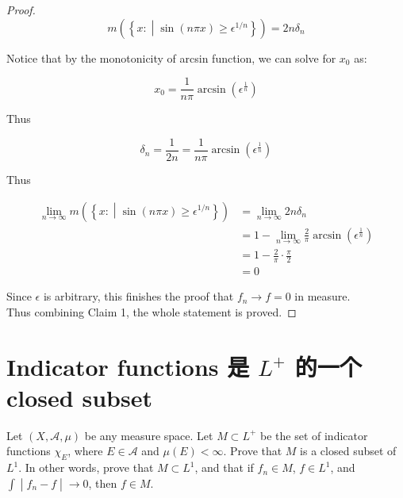 \documentclass{qlnotes-export}
\begin{document}
\begin{proof}
\[m(\left\{ x: \middle| \sin(n\pi x) \geq \epsilon^{1/n} \right\}) = 2n\delta_{n}\]

Notice that by the monotonicity of arcsin function, we can solve for \(x_{0}\) as:

\[x_{0} = \frac{1}{n\pi}\arcsin(\epsilon^{\frac{1}{n}})\]

Thus

\[\delta_{n} = \frac{1}{2n} = \frac{1}{n\pi}\arcsin(\epsilon^{\frac{1}{n}})\]

Thus

\[\begin{matrix}
{\lim\limits_{n\rightarrow\infty}m(\left\{ x: \middle| \sin(n\pi x) \geq \epsilon^{1/n} \right\})} & {= \lim\limits_{n\rightarrow\infty}2n\delta_{n}} \\
 & {= 1 - \lim\limits_{n\rightarrow\infty}\frac{2}{\pi}\arcsin(\epsilon^{\frac{1}{n}})} \\
 & {= 1 - \frac{2}{\pi} \cdot \frac{\pi}{2}} \\
 & {= 0}
\end{matrix}\]

Since \(\epsilon\) is arbitrary, this finishes the proof that \(f_{n}\rightarrow f = 0\) in measure.\\
Thus combining Claim 1, the whole statement is proved.

\end{proof}

\section{\texorpdfstring{Indicator functions 是 \(L^{+}\) 的一个 closed subset}{Indicator functions 是 L\^{}\{+\} 的一个 closed subset}}\label{indicator-functions-ux662f-l-ux7684ux4e00ux4e2a-closed-subset}

Let \((X,\mathcal{A},\mu)\) be any measure space. Let \(M \subset L^{+}\) be the set of indicator functions \(\chi_{E}\), where \(E \in \mathcal{A}\) and \(\mu(E) < \infty\). Prove that \(M\) is a closed subset of \(L^{1}\). In other words, prove that \(M \subset L^{1}\), and that if \(f_{n} \in M\), \(f \in L^{1}\), and \(\left. \int \middle| f_{n} - f \middle| \rightarrow 0 \right.\), then \(f \in M\).
\end{document}
